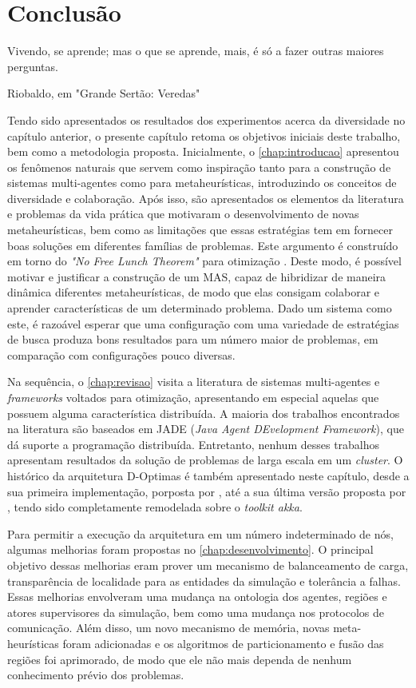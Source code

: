 \chapter{Conclusão}
\label{chap:conclusao}

\epigraph{Vivendo, se aprende; mas o que se aprende, mais, é só a fazer outras maiores perguntas.}{Riobaldo, em "Grande Sertão: Veredas"}

Tendo sido apresentados os resultados dos experimentos acerca da diversidade no capítulo anterior, o presente capítulo retoma os objetivos iniciais deste trabalho, bem como a metodologia proposta. Inicialmente, o \autoref{chap:introducao} apresentou os fenômenos naturais que servem como inspiração tanto para a construção de sistemas multi-agentes como para metaheurísticas, introduzindo os conceitos de diversidade e colaboração. Após isso, são apresentados os elementos da literatura e problemas da vida prática que motivaram o desenvolvimento de novas metaheurísticas, bem como as limitações que essas estratégias tem em fornecer boas soluções em diferentes famílias de problemas. Este argumento é construído em torno do \textit{"No Free Lunch Theorem"} para otimização \cite{wolpert1997}. Deste modo, é possível motivar e justificar a construção de um MAS, capaz de hibridizar de maneira dinâmica diferentes  metaheurísticas, de modo que elas consigam colaborar e aprender características de um determinado problema. Dado um sistema como este, é razoável esperar que uma configuração com uma variedade de estratégias de busca produza bons resultados para um número maior de problemas, em comparação com configurações pouco diversas. 

Na sequência, o \autoref{chap:revisao} visita a literatura de sistemas multi-agentes e \textit{frameworks} voltados para otimização, apresentando em especial aquelas que  possuem alguma característica distribuída. A maioria dos trabalhos encontrados na literatura são baseados em JADE (\textit{Java Agent DEvelopment Framework}), que dá suporte a programação distribuída. Entretanto, nenhum desses trabalhos apresentam resultados da solução de problemas de larga escala em um \textit{cluster}. O histórico da arquitetura D-Optimas é também apresentado neste capítulo, desde a sua primeira implementação, porposta por , até a sua última versão proposta por , tendo sido completamente remodelada sobre o \textit{toolkit akka}.

Para permitir a execução da arquitetura em um número indeterminado de nós, algumas melhorias foram propostas no \autoref{chap:desenvolvimento}. O principal objetivo dessas melhorias eram prover um mecanismo de balanceamento de carga, transparência de localidade para as entidades da simulação e tolerância a falhas. Essas melhorias envolveram uma mudança na ontologia dos agentes, regiões e atores supervisores da simulação, bem como uma mudança nos protocolos de comunicação. Além disso, um novo mecanismo de memória, novas meta-heurísticas foram adicionadas e os algoritmos de particionamento e fusão das regiões foi aprimorado, de modo que ele não mais dependa de nenhum conhecimento prévio dos problemas.


